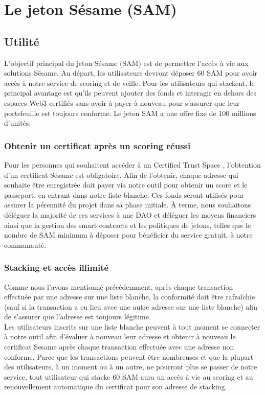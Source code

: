 ﻿\documentclass[a4paper]{article}
\let\OldTexttrademark\texttrademark
\renewcommand{\texttrademark}{\OldTexttrademark\xspace}%
\begin{document}
\newpage
\section{Le jeton Sésame (SAM)}
\subsection{Utilit\'e}
L'objectif principal du jeton Sésame (SAM) est de permettre l'accès à vie aux solutions Sésame. Au départ, les utilisateurs devront déposer 60 SAM pour avoir accès à notre service de scoring et de veille. Pour les utilisateurs qui stackent, le principal avantage est qu'ils peuvent ajouter des fonds et interagir en dehors des espaces Web3 certifiés sans avoir à payer à nouveau pour s'assurer que leur portefeuille est toujours conforme. Le jeton SAM a une offre fixe de 100 millions d'unités.
\subsubsection{Obtenir un certificat après un scoring réussi} 
Pour les personnes qui souhaitent accéder à un Certified Trust Space \OldTexttrademark, l’obtention d’un certificat Sésame est obligatoire. Afin de l’obtenir, chaque adresse qui souhaite être enregistrée doit payer via notre outil pour obtenir un score et le passeport, en entrant dans notre liste blanche. Ces fonds seront utilisés pour assurer la pérennité du projet dans sa phase initiale. À terme, nous souhaitons déléguer la majorité de ces services à une DAO et déléguer les moyens financiers ainsi que la gestion des smart contracts et les politiques de jetons, telles que le nombre de SAM minimum à déposer pour bénéficier du service gratuit, à notre communauté.
\subsubsection{Stacking et accès illimité}
Comme nous l'avons mentionné précédemment, après chaque transaction effectuée par une adresse sur une liste blanche, la conformité doit être rafraîchie (sauf si la transaction a eu lieu avec une autre adresse sur une liste blanche) afin de s'assurer que l'adresse est toujours légitime. \\

Les utilisateurs inscrits sur une liste blanche peuvent à tout moment se connecter à notre outil afin d'évaluer à nouveau leur adresse et obtenir à nouveau le certificat Sesame après chaque transaction effectuée avec une adresse non conforme. Parce que les transactions peuvent être nombreuses et que la plupart des utilisateurs, à un moment ou à un autre, ne pourront plus se passer de notre service, tout utilisateur qui stacke 60 SAM aura un accès à vie au scoring et au renouvellement automatique du certificat pour son adresse de stacking. 
\end{document}
